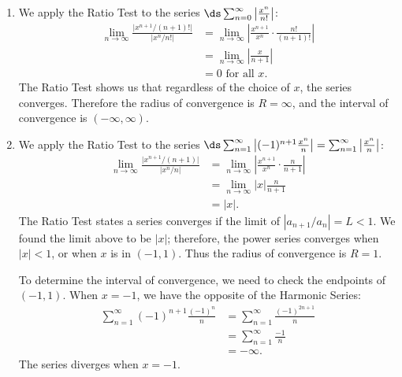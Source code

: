 {\begin{enumerate}
	\item We apply the Ratio Test to the series $\ds \sum_{n=0}^\infty \left|\frac{x^n}{n!}\right|$:
		\begin{align*}
		\lim_{n\to\infty} \frac{\big|x^{n+1}/(n+1)!\big|}{\big|x^n/n!\big|} &= \lim_{n\to\infty} \left|\frac{x^{n+1}}{x^n}\cdot\frac{n!}{(n+1)!}\right|\\
			&= \lim_{n\to\infty} \left|\frac x{n+1}\right|\\
			&= 0 \text{ for all } x.
		\end{align*}
		The Ratio Test shows us that regardless of the choice of $x$, the series converges. Therefore the radius of convergence is $R=\infty$, and the interval of convergence is $(-\infty,\infty)$.
		
	\item		We apply the Ratio Test to the series $\ds \sum_{n=1}^\infty \left|(-1)^{n+1}\frac{x^n}{n}\right| = \sum_{n=1}^\infty \left|\frac{x^n}{n}\right|$:
	\begin{align*}
	\lim_{n\to\infty} \frac{\big|x^{n+1}/(n+1)\big|}{\big|x^n/n\big|} &= \lim_{n\to\infty} \left|\frac{x^{n+1}}{x^n}\cdot \frac{n}{n+1}\right| \\
			&= \lim_{n\to\infty} |x|\frac{n}{n+1}\\
			&= |x|.
	\end{align*}
	The Ratio Test states a series converges if the limit of $|a_{n+1}/a_n| = L<1$. We found the limit above to be $|x|$; therefore, the power series converges when $|x| <1$, or when $x$ is in $(-1,1)$. Thus the radius of convergence is $R=1$.
	
	To determine the interval of convergence, we need to check the endpoints of $(-1,1)$. When $x=-1$, we have the opposite of the Harmonic Series:
	\begin{align*}
	\sum_{n=1}^\infty (-1)^{n+1}\frac{(-1)^n}{n}
	&= \sum_{n=1}^\infty \frac{(-1)^{2n+1}}{n}\\
	&= \sum_{n=1}^\infty \frac{-1}{n}\\
	&= -\infty.
	\end{align*}
	The series diverges when $x=-1$.
	

\end{enumerate}}
